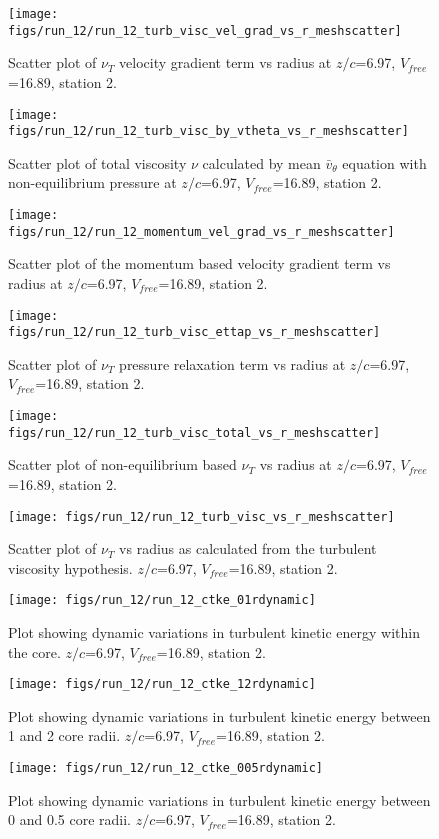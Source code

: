 \begin{figure}[H]
\centering
\texttt{[image: figs/run\_12/run\_12\_turb\_visc\_vel\_grad\_vs\_r\_meshscatter]}
\caption{Scatter plot of $\nu_T$ velocity gradient term vs radius at $z/c$=6.97, $V_{free}$=16.89, station 2.}
\end{figure}


\begin{figure}[H]
\centering
\texttt{[image: figs/run\_12/run\_12\_turb\_visc\_by\_vtheta\_vs\_r\_meshscatter]}
\caption{Scatter plot of total viscosity $\nu$ calculated by mean $\bar{v}_{\theta}$ equation with non-equilibrium pressure at $z/c$=6.97, $V_{free}$=16.89, station 2.}
\end{figure}


\begin{figure}[H]
\centering
\texttt{[image: figs/run\_12/run\_12\_momentum\_vel\_grad\_vs\_r\_meshscatter]}
\caption{Scatter plot of the momentum based velocity gradient term vs radius at $z/c$=6.97, $V_{free}$=16.89, station 2.}
\end{figure}


\begin{figure}[H]
\centering
\texttt{[image: figs/run\_12/run\_12\_turb\_visc\_ettap\_vs\_r\_meshscatter]}
\caption{Scatter plot of $\nu_T$ pressure relaxation term vs radius at $z/c$=6.97, $V_{free}$=16.89, station 2.}
\end{figure}


\begin{figure}[H]
\centering
\texttt{[image: figs/run\_12/run\_12\_turb\_visc\_total\_vs\_r\_meshscatter]}
\caption{Scatter plot of non-equilibrium based $\nu_T$ vs radius at $z/c$=6.97, $V_{free}$=16.89, station 2.}
\end{figure}


\begin{figure}[H]
\centering
\texttt{[image: figs/run\_12/run\_12\_turb\_visc\_vs\_r\_meshscatter]}
\caption{Scatter plot of $\nu_T$ vs radius as calculated from the turbulent viscosity hypothesis. $z/c$=6.97, $V_{free}$=16.89, station 2.}
\end{figure}


\begin{figure}[H]
\centering
\texttt{[image: figs/run\_12/run\_12\_ctke\_01rdynamic]}
\caption{Plot showing dynamic variations in turbulent kinetic energy within the core. $z/c$=6.97, $V_{free}$=16.89, station 2.}
\end{figure}


\begin{figure}[H]
\centering
\texttt{[image: figs/run\_12/run\_12\_ctke\_12rdynamic]}
\caption{Plot showing dynamic variations in turbulent kinetic energy between 1 and 2 core radii. $z/c$=6.97, $V_{free}$=16.89, station 2.}
\end{figure}


\begin{figure}[H]
\centering
\texttt{[image: figs/run\_12/run\_12\_ctke\_005rdynamic]}
\caption{Plot showing dynamic variations in turbulent kinetic energy between 0 and 0.5 core radii. $z/c$=6.97, $V_{free}$=16.89, station 2.}
\end{figure}



